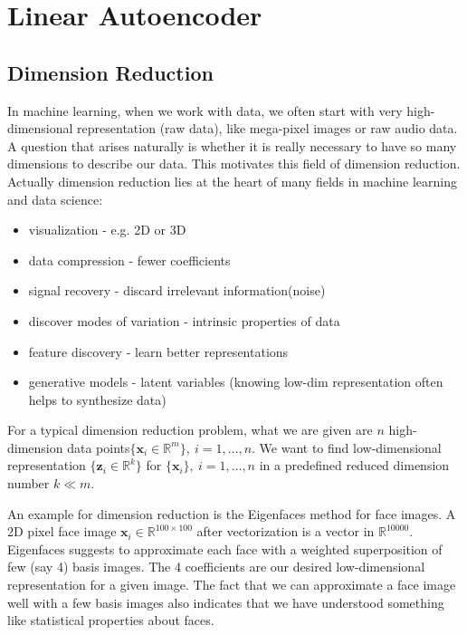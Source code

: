 \documentclass[../book-template.tex]{subfiles}
\begin{document}
\chapter{Linear Autoencoder}

\section{Dimension Reduction}
In machine learning, when we work with data, we often start with very high-dimensional representation (raw data), like mega-pixel images or raw audio data. A question that arises naturally is whether it is really necessary to have so many dimensions to describe our data. This motivates this field of dimension reduction. Actually dimension reduction lies at the heart of many fields in machine learning and data science:
\begin{itemize}
    \item visualization - e.g. 2D or 3D
    \item data compression - fewer coefficients
    \item signal recovery - discard irrelevant information(noise)
    \item discover modes of variation - intrinsic properties of data
    \item feature discovery - learn better representations
    \item generative models - latent variables (knowing low-dim representation often helps to synthesize data)
\end{itemize}
\par For a typical dimension reduction problem, what we are given are $n$ high-dimension data points$\{\bm{x}_i\in\mathbb{R}^{m}\},\ i=1,\dots,n$.
We want to find low-dimensional representation $\{\bm{z}_i\in \mathbb{R}^k\}$ for $\{\bm{x}_i\},\ i=1,\dots,n$ in a predefined reduced dimension number $k\ll m$.
\par An example for dimension reduction is the Eigenfaces method for face images. A 2D pixel face image $\bm{x}_i\in \mathbb{R}^{100\times 100}$ after vectorization is a vector in $\mathbb{R}^{10000}$. Eigenfaces suggests to approximate each face with a weighted superposition of few (say 4) basis images. The 4 coefficients are our desired low-dimensional representation for a given image. The fact that we can approximate a face image well with a few basis images also indicates that we have understood something like statistical properties about faces.
\end{document}
